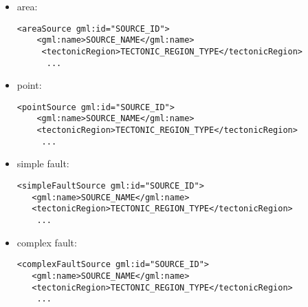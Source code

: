 \begin{itemize}
\item area:
\begin{Verbatim}[frame=single]
 <areaSource gml:id="SOURCE_ID">
    <gml:name>SOURCE_NAME</gml:name>
     <tectonicRegion>TECTONIC_REGION_TYPE</tectonicRegion>
      ...
\end{Verbatim}
\item point:
\begin{Verbatim}[frame=single]
<pointSource gml:id="SOURCE_ID">
    <gml:name>SOURCE_NAME</gml:name>
    <tectonicRegion>TECTONIC_REGION_TYPE</tectonicRegion>
     ...
\end{Verbatim}
\item simple fault:
\begin{Verbatim}[frame=single]
<simpleFaultSource gml:id="SOURCE_ID">
   <gml:name>SOURCE_NAME</gml:name>
   <tectonicRegion>TECTONIC_REGION_TYPE</tectonicRegion>
    ...
\end{Verbatim}
\item complex fault:
\begin{Verbatim}[frame=single]
<complexFaultSource gml:id="SOURCE_ID">
   <gml:name>SOURCE_NAME</gml:name>
   <tectonicRegion>TECTONIC_REGION_TYPE</tectonicRegion>
    ...
\end{Verbatim}
\end{itemize}
